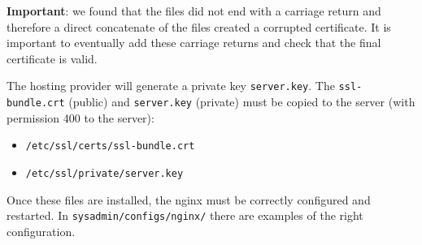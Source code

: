 \textbf{Important}: we found that the files did not end with a carriage return and therefore a direct concatenate of the files created a corrupted certificate. It is important to eventually add these carriage returns and check that the final certificate is valid.

The hosting provider will generate a private key {\tt server.key}.
The {\tt ssl-bundle.crt} (public) and {\tt server.key} (private) must be copied to the server (with permission 400 to the server):
\begin{itemize}
    \item {\tt /etc/ssl/certs/ssl-bundle.crt}
    \item {\tt /etc/ssl/private/server.key}
\end{itemize}

Once these files are installed, the nginx must be correctly configured and restarted. In {\tt sysadmin/configs/nginx/} there are examples of the right configuration.
